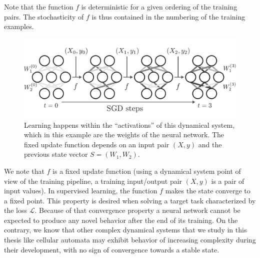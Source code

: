 Note that the function $f$ is deterministic for a given ordering of the training
pairs. The stochasticity of $f$ is thus contained in the numbering of the
training examples.

\begin{figure}[ht]
  \centering
  \includegraphics[width=.9\linewidth]{figures/learning_nn.pdf}
  \caption{\label{fig:label} Learning happens within the ``activations'' of this
    dynamical system, which in this example are the weights of the neural
    network. The fixed update function depends on an input pair $(X, y)$
    and the previous state vector $S = (W_1, W_2)$.}
\end{figure}

We note that $f$ is a fixed update function (using a dynamical system point of
view of the training pipeline, a training input/output pair $(X, y)$ is a pair
of input values). In supervised learning, the function $f$ makes the state
converge to a fixed point. This property is desired when solving a target task
characterized by the loss $\mathcal{L}$. Because of that convergence property a neural
network cannot be expected to produce any novel behavior after the end of its
training. On the contrary, we know that other complex dynamical systems that we
study in this thesis like cellular automata may exhibit behavior of increasing
complexity during their development, with no sign of convergence towards a
stable state.
